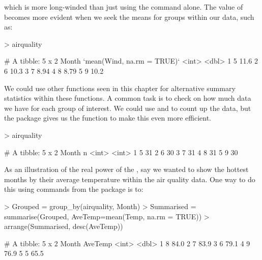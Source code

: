 which is more long-winded than just using the  command alone. The value of  becomes more evident when we seek the means for groups within our data, such as: 

\begin{Schunk}
\begin{Sinput}
> airquality%>% group_by(Month) %>% summarise(mean(Wind, na.rm = TRUE)) 
\end{Sinput}
\begin{Soutput}
# A tibble: 5 x 2
  Month `mean(Wind, na.rm = TRUE)`
  <int>                      <dbl>
1     5                      11.6 
2     6                      10.3 
3     7                       8.94
4     8                       8.79
5     9                      10.2 
\end{Soutput}
\end{Schunk}

 
We could use other functions seen in this chapter for alternative summary statistics within these functions. A common task is to check on how much data we have for each group of interest. We could use  and  to count up the data, but the  package gives us the  function to make this even more efficient. 

\begin{Schunk}
\begin{Sinput}
> airquality%>% count(Month) 
\end{Sinput}
\begin{Soutput}
# A tibble: 5 x 2
  Month     n
  <int> <int>
1     5    31
2     6    30
3     7    31
4     8    31
5     9    30
\end{Soutput}
\end{Schunk}

 
 
As an illustration of the real power of the , say we wanted to show the hottest months by their average temperature within the air quality data. One way to do this using commands from the  package is to: 

\begin{Schunk}
\begin{Sinput}
> Grouped = group_by(airquality, Month) 
> Summarised = summarise(Grouped, AveTemp=mean(Temp, na.rm = TRUE)) 
> arrange(Summarised, desc(AveTemp)) 
\end{Sinput}
\begin{Soutput}
# A tibble: 5 x 2
  Month AveTemp
  <int>   <dbl>
1     8    84.0
2     7    83.9
3     6    79.1
4     9    76.9
5     5    65.5
\end{Soutput}
\end{Schunk}

